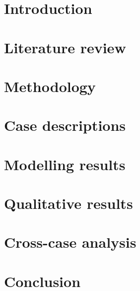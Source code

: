 \documentclass[12pt,table,xcdraw]{book}
\renewcommand{\bibname}{References}
\begin{document}
\newpage
\setcounter{tocdepth}{3}
\tableofcontents

\newpage

\listoffigures

\newpage

\listoftables

\mainmatter

\chapter{Introduction} \label{chp:intro}


\chapter{Literature review} \label{chp:lit_review}


\chapter{Methodology} \label{chp:methodology}


\chapter{Case descriptions} \label{chp:case_overview}


\chapter{Modelling results} \label{chp:ergm_result}

%
\chapter{Qualitative results} \label{chp:qual_analysis}

%
\chapter{Cross-case analysis} \label{chp:cross_case}

%
\chapter{Conclusion} \label{chp:conclusions}


\renewcommand{\bibname}{References}


\appendix
\end{document}
